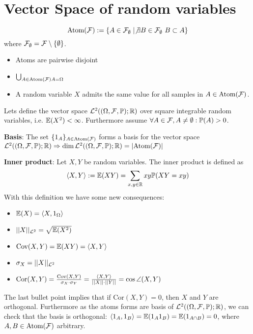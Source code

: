 \section{Vector Space of random variables}
\begin{definition*}[Atoms of \(\F\)]
  \[\text{Atom}(\mathcal{F}) := \{A \in \mathcal{F}_{\emptyset} \mid \not \exists B \in \mathcal{F}_{\emptyset} \ B \subset A\}\]
  where \(\mathcal{F}_{\emptyset} = \mathcal{F} \setminus \{\emptyset\}\).
\end{definition*}
\begin{itemize}
  \item Atoms are pairwise disjoint
  \item \(\bigcup_{A \in \text{Atom}(\mathcal{F}) A = \Omega}\)
  \item A random variable \(X\) admits the same value for all samples in \(A \in \text{Atom}(\mathcal{F})\).
\end{itemize}


Lets define the vector space \(\mathcal{L}^2((\Omega, \mathcal{F}, \mathbb{P}); \mathbb{R})\) over square integrable random variables, i.e. \(\mathbb{E}(X^2) < \infty\). Furthermore assume \(\forall A \in \mathcal{F}, A \neq \emptyset: \mathbb{P}(A) > 0\).

\textbf{Basis}: The set \(\{1_A\}_{A \in \text{Atom}(\mathcal{F})}\) forms a basis for the vector space \(\mathcal{L}^2((\Omega, \mathcal{F}, \mathbb{P}); \mathbb{R}) \Rightarrow \text{dim} \, \mathcal{L}^2((\Omega, \mathcal{F}, \mathbb{P}); \mathbb{R}) = |\text{Atom}(\mathcal{F})|\)

\textbf{Inner product}: Let \(X, Y\) be random variables. The inner product is defined as
\[\langle X, Y \rangle := \mathbb{E}(XY) = \sum_{x, y \in \mathbb{R}} xy \mathbb{P}(XY = xy)\]
With this definition we have some new consequences:
\begin{itemize}
  \item \(\mathbb{E}(X) = \langle X, 1_\Omega \rangle\)
  \item \(||X||_{\mathcal{L}^2} = \sqrt{\mathbb{E}(X^2)}\)
  \item \(\text{Cov}(X, Y) = \mathbb{E}(XY) = \langle X, Y \rangle\)
  \item \(\sigma_X = ||X||_{\mathcal{L}^2}\)
  \item \(\text{Cor}(X, Y) = \frac{\text{Cov}(X, Y)}{\sigma_X \cdot \sigma_Y} = \frac{\langle X, Y \rangle}{||X|| \cdot ||Y||} = \cos \angle (X, Y)\)
\end{itemize}
The last bullet point implies that if \(\text{Cor}(X, Y) = 0\), then \(X\) and \(Y\) are orthogonal. Furthermore as the atoms forms are basis of \(\mathcal{L}^2((\Omega, \mathcal{F}, \mathbb{P}); \mathbb{R})\), we can check that the basis is orthogonal: \(\langle 1_A, 1_B \rangle = \mathbb{E}(1_A 1_B) = \mathbb{E}(1_{A \cap B}) = 0\), where \(A, B \in \text{Atom}(\mathcal{F})\) arbitrary.

